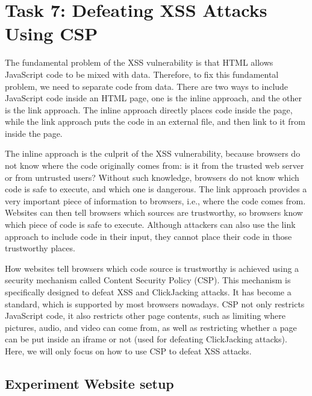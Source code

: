 \section{Task 7: Defeating XSS Attacks Using CSP}

The fundamental problem of the XSS vulnerability is that HTML allows JavaScript code to be
mixed with data. Therefore, to fix this fundamental problem, we need to separate code from
data. There are two ways to include JavaScript code inside an HTML page, one is
the inline approach, and the other is the link approach.
The inline approach directly places code inside the page, while the
link approach puts the code in an external file, and then link to it
from inside the page.

The inline approach is the culprit of the XSS vulnerability, because
browsers do not know where the code originally comes from: is it from the trusted
web server or from untrusted users? Without such knowledge, browsers
do not know which code is safe to execute, and
which one is dangerous.
The link approach provides a very important piece of information to
browsers, i.e., where
the code comes from. Websites can then tell browsers which sources are
trustworthy, so browsers know which piece of code is safe to execute.
Although attackers can also use the link approach to
include code in their input, they cannot place their code in
those trustworthy places.

How websites tell browsers which code source is trustworthy is achieved
using a security mechanism called Content Security Policy (CSP). This
mechanism is specifically designed to defeat XSS and ClickJacking attacks.
It has become a standard, which is supported by most browsers nowadays.
CSP not only restricts JavaScript code, it also restricts other page contents, such as
limiting where pictures, audio, and video can come from, as well as restricting
whether a page can be put inside an iframe or not (used for defeating ClickJacking
attacks). Here, we will only focus on how to use CSP to defeat XSS attacks.



\subsection{Experiment Website setup} 

